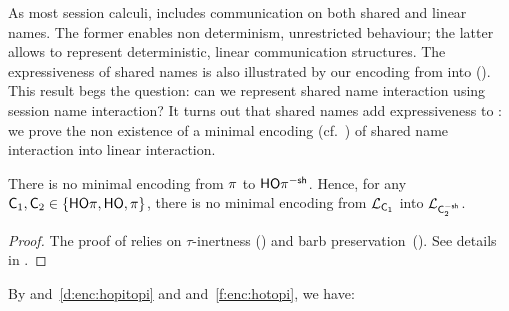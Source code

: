 \documentclass[runningheads]{llncs}
\begin{document}
{{As most session calculi, 
\HOp includes communication on both shared and linear names.
The former enables non determinism, unrestricted behaviour; the latter allows to represent
deterministic, linear communication structures.
The expressiveness of shared names is also illustrated by our 
encoding from \HOp into \sessp ().
This result begs the question: 
can we represent shared name interaction using session name interaction?
It turns out that shared names  add expressiveness to \HOp:
we prove
the non existence of a minimal encoding 
(cf.~)
of shared name 
interaction into linear interaction. %


\begin{theorem}%
	\label{t:negative}
	There is no minimal encoding from
		$\pi$ to $\mathsf{HO}\pi^{\mathsf{-sh}}$.
	Hence, for any
		$\mathsf{C}_1,\mathsf{C}_2\in \{ \mathsf{HO}\pi, \mathsf{HO}, \pi\}$, 
	there is no minimal encoding from  
	$\mathcal{L}_{\mathsf{C}_1}$ 
	into
		$\mathcal{L}_{\mathsf{C}_2^{-\mathsf{sh}}}$.
\end{theorem}

\begin{proof}
	The proof of  relies on
	$\tau$-inertness ()
	and barb preservation~().
	See details in .
\end{proof}

By 
	 and~\ref{d:enc:hopitopi} 
	and  and~\ref{f:enc:hotopi}, 
we have:
\smallskip 
{}


}}
\end{document}
